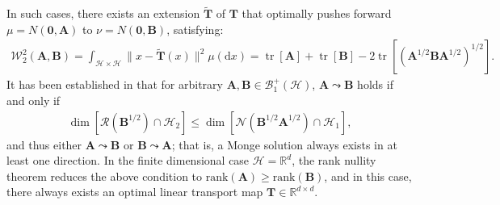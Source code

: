\documentclass[noinfoline]{imsart}\setcounter{tocdepth}{2}
\renewcommand{\b}[1]{\mathbb{#1}}
\newcommand{\m}[1]{\mathbf{#1}}
\renewcommand{\c}[1]{\mathcal{#1}}
\newcommand{\rd}{\mathrm{d}}
\DeclareMathOperator{\tr}{tr}
\theoremstyle{plain}
\begin{document}
In such cases, there exists an extension $\tilde{\m{T}}$ of $\m{T}$ that optimally pushes forward $\mu = N(\m{0}, \m{A})$ to $\nu = N(\m{0}, \m{B})$, satisfying:
\begin{align*}
    \c{W}_{2}^{2}(\m{A}, \m{B}) = \int_{\c{H} \times \c{H}} \|x-\tilde{\m{T}}(x)\|^{2} \mu(\rd x) = \tr [\m{A}] + \tr [\m{B}] - 2 \tr [(\m{A}^{1/2} \m{B} \m{A}^{1/2})^{1/2}].
\end{align*}
It has been established in \cite{yun2025gaussian} that for arbitrary $\m{A}, \m{B} \in \c{B}_{1}^{+}(\c{H})$, $\m{A} \leadsto \m{B}$ holds if and only if
\begin{align*}
    \dim [\c{R}(\m{B}^{1/2}) \cap \c{H}_{2}] \le \dim [\c{N}(\m{B}^{1/2} \m{A}^{1/2}) \cap \c{H}_{1}],
\end{align*}
and thus either $\m{A} \leadsto \m{B}$ or $\m{B} \leadsto \m{A}$; that is, a Monge solution always exists in at least one direction. In the finite dimensional case $\c{H} = \b{R}^{d}$, the rank nullity theorem reduces the above condition to $\mathrm{rank}(\m{A}) \ge \mathrm{rank}(\m{B})$, and in this case, there always exists an optimal linear transport map $\m{T} \in \b{R}^{d \times d}$.
\end{document}
